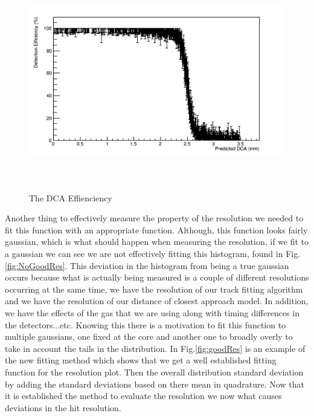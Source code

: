 \documentclass[./Thesis]{subfiles}
\begin{document}
\begin{figure}
	\centerline{\includegraphics[height=95mm]{GoodDCAEff.jpeg}}
	\caption[Good DCA Effieciency]{ The DCA Effienciency}
	\label{fig:goodDCAeff}
\end{figure} 	

	 
	 Another thing to effectively measure the property of the resolution we needed to fit this function with an appropriate function. Although, this function looks fairly gaussian, which is what should happen when measuring the resolution, if we fit to a gaussian we can see we are not effectively fitting this histogram, found in Fig. \ref{fig:NoGoodRes}. This deviation in the histogram from being a true gaussian occurs because what is actually being measured is a couple of different resolutions occurring at the same time, we have the resolution of our track fitting algorithm and we have the resolution of our distance of closest approach model. In addition, we have the effects of the gas that we are using along with timing differences in the detectors...etc. Knowing this there is a motivation to fit this function to multiple gaussians, one fixed at the core and another one to broadly overly to take in account the tails in the distribution. In Fig.\ref{fig:goodRes}  is an example of the new fitting method which shows that we get a well established fitting function for the resolution plot. Then the overall distribution standard deviation by adding the standard deviations based on there mean in quadrature. Now that it is established the method to evaluate the resolution we now what causes deviations in the hit resolution.
	
	
\end{document}
